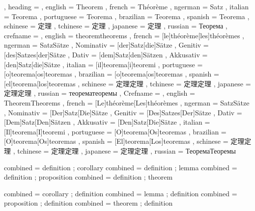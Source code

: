   {
    , heading =   {
                    , english     = Theorem
                    , french      = Théorème
                    , ngerman     = Satz
                    , italian     = Teorema
                    , portuguese  = Teorema
                    , brazilian   = Teorema
                    , spanish     = Teorema
                    , schinese    = 定理
                    , tchinese    = 定理
                    , japanese    = 定理
                    , russian     = Теорема
                  }
    , crefname =  {
                    , english     = {theorem}{theorems}
                    , french      = [le]{théorème}[les]{théorèmes}
                    , ngerman     = { {Satz}{Sätze}
                                      , Nominativ = [der]{Satz}[die]{Sätze}
                                      , Genitiv   = [des]{Satzes}[der]{Sätze}
                                      , Dativ     = [dem]{Satz}[den]{Sätzen}
                                      , Akkusativ = [den]{Satz}[die]{Sätze}
                                    }
                    , italian     = [il]{teorema}[i]{teoremi}
                    , portuguese  = [o]{teorema}[os]{teoremas}
                    , brazilian   = [o]{teorema}[os]{teoremas}
                    , spanish     = [el]{teorema}[los]{teoremas}
                    , schinese    = {定理}{定理}
                    , tchinese    = {定理}{定理}
                    , japanese    = {定理}{定理}
                    , russian     = {теорема}{теоремы}
                  }
    , Crefname =  {
                    , english     = {Theorem}{Theorems}
                    , french      = [Le]{théorème}[Les]{théorèmes}
                    , ngerman     = { {Satz}{Sätze}
                                      , Nominativ = [Der]{Satz}[Die]{Sätze}
                                      , Genitiv   = [Des]{Satzes}[Der]{Sätze}
                                      , Dativ     = [Dem]{Satz}[Den]{Sätzen}
                                      , Akkusativ = [Den]{Satz}[Die]{Sätze}
                                    }
                    , italian     = [Il]{teorema}[I]{teoremi}
                    , portuguese  = [O]{teorema}[Os]{teoremas}
                    , brazilian   = [O]{teorema}[Os]{teoremas}
                    , spanish     = [El]{teorema}[Los]{teoremas}
                    , schinese    = {定理}{定理}
                    , tchinese    = {定理}{定理}
                    , japanese    = {定理}{定理}
                    , russian     = {Теорема}{Теоремы}
                  }
  }

 { combined = { definition ; corollary } }
 { combined = { definition ; lemma } }
 { combined = { definition ; proposition } }
 { combined = { definition ; theorem } }

 { combined = { corollary ; definition } }
 { combined = { lemma ; definition } }
 { combined = { proposition ; definition } }
 { combined = { theorem ; definition } }
